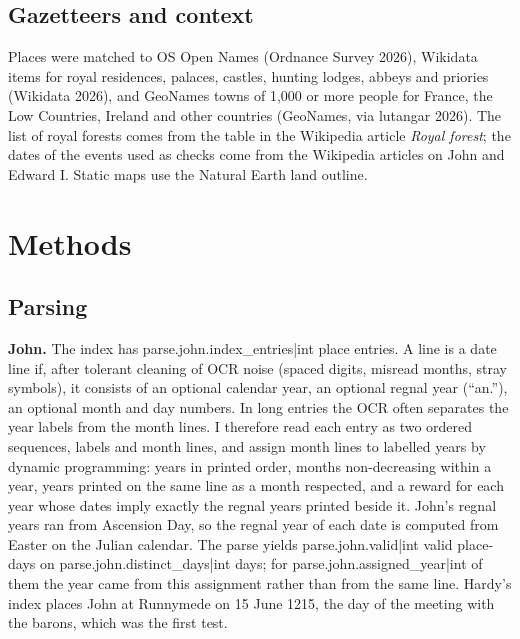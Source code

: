 \documentclass[11pt,a4paper]{article}
\begin{document}
\subsection{Gazetteers and context}

Places were matched to OS Open Names (Ordnance Survey 2026), Wikidata items for royal residences, palaces, castles, hunting lodges, abbeys and priories (Wikidata 2026), and GeoNames towns of 1,000 or more people for France, the Low Countries, Ireland and other countries (GeoNames, via lutangar 2026). The list of royal forests comes from the table in the Wikipedia article \textit{Royal forest}; the dates of the events used as checks come from the Wikipedia articles on John and Edward I. Static maps use the Natural Earth land outline.

\section{Methods}

\subsection{Parsing}

\textbf{John.} The index has {{parse.john.index_entries|int}} place entries. A line is a date line if, after tolerant cleaning of OCR noise (spaced digits, misread months, stray symbols), it consists of an optional calendar year, an optional regnal year (``an.''), an optional month and day numbers. In long entries the OCR often separates the year labels from the month lines. I therefore read each entry as two ordered sequences, labels and month lines, and assign month lines to labelled years by dynamic programming: years in printed order, months non-decreasing within a year, years printed on the same line as a month respected, and a reward for each year whose dates imply exactly the regnal years printed beside it. John's regnal years ran from Ascension Day, so the regnal year of each date is computed from Easter on the Julian calendar. The parse yields {{parse.john.valid|int}} valid place-days on {{parse.john.distinct_days|int}} days; for {{parse.john.assigned_year|int}} of them the year came from this assignment rather than from the same line. Hardy's index places John at Runnymede on 15 June 1215, the day of the meeting with the barons, which was the first test.
\end{document}
